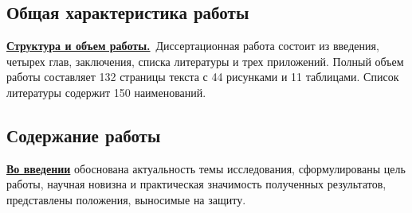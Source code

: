 \subsection*{Общая характеристика работы}

\newcommand{\actuality}{\underline{\textbf{Актуальность темы исследования.}}}
\newcommand{\aim}{\underline{\textbf{Целью}}}
\newcommand{\tasks}{\underline{\textbf{задачи}}}
\newcommand{\defpositions}{\underline{\textbf{Положения, выносимые на~защиту:}}}
\newcommand{\novelty}{\underline{\textbf{Научная новизна:}}}
\newcommand{\influence}{\underline{\textbf{Практическая значимость:}}}
\newcommand{\methodology}{\underline{\textbf{Методы исследования.}}}
\newcommand{\reliability}{\underline{\textbf{Достоверность}}}
\newcommand{\probation}{\underline{\textbf{Апробация результатов.}}}
\newcommand{\contribution}{\underline{\textbf{Личный вклад.}}}
\newcommand{\implement}{\underline{\textbf{Внедрение результатов.}}}
\newcommand{\publications}{\underline{\textbf{Публикации.}}}
\newcommand{\structure}{\underline{\textbf{Структура и объем работы.}}}



\structure\ Диссертационная работа состоит из введения, четырех глав, заключения, списка литературы и трех приложений. Полный объем работы составляет 132 страницы текста с 44 рисунками и 11 таблицами. Список литературы содержит 150 наименований. 

\subsection*{Содержание работы}

\underline{\textbf{Во введении}} обоснована актуальность темы исследования, сформулированы цель работы, научная новизна и практическая значимость полученных результатов, представлены положения, выносимые на защиту.


